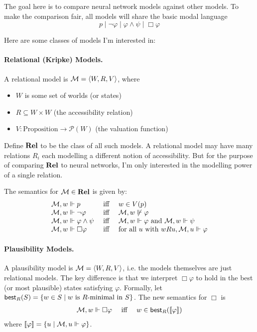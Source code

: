 \documentclass[letterpaper]{article}
\begin{document}
The goal here is to compare neural network models against other models.  To make the comparison fair, all models will share the basic modal language
\[
    p \mid \neg \varphi \mid \varphi \land \psi \mid \Box \varphi
\]

Here are some classes of models I'm interested in:

\paragraph*{Relational (Kripke) Models.} A relational model is $\mathcal{M} = \langle W, R, V \rangle$, where 
\begin{itemize}
    \item $W$ is some set of worlds (or states)
    \item $R \subseteq W \times W$ (the accessibility relation)
    \item $V : \textrm{Proposition} \to \mathcal{P}(W)$ (the valuation function)
\end{itemize}
Define $\textrm{\textbf{Rel}}$ to be the class of all such models.  A relational model may have many relations $R_i$ each modelling a different notion of accessibility.  But for the purpose of comparing $\textrm{\textbf{Rel}}$ to neural networks, I'm only interested in the modelling power of a single relation.

The semantics for $\mathcal{M} \in \textrm{\textbf{Rel}}$ is given by:
\[
\begin{array}{lcl}
    \mathcal{M}, w \Vdash p & \mbox{ iff } & w \in V(p)\\
    \mathcal{M}, w \Vdash \neg \varphi & \mbox{ iff } & \mathcal{M}, w \not \Vdash \varphi\\
    \mathcal{M}, w \Vdash \varphi \land \psi & \mbox{ iff } & \mathcal{M}, w \Vdash \varphi \mbox{ and } \mathcal{M}, w \Vdash \psi\\
    \mathcal{M}, w \Vdash \Box \varphi & \mbox{ iff } & \mbox{for all } u \mbox{ with } w{R}u, \mathcal{M}, u \Vdash \varphi
\end{array}
\]

\paragraph*{Plausibility Models.}
A plausibility model is $\mathcal{M} = \langle W, R, V \rangle$, i.e. the models themselves are just relational models.  The key difference is that we interpret $\Box \varphi$ to hold in the best (or most plausible) states satisfying $\varphi$.  Formally, let $\mathsf{best}_R{(S)} = \{ w \in S \mid w \textrm{ is } R\textrm{-minimal in } S \}$.  The new semantics for $\Box$ is
\[
\begin{array}{lcl}
    \mathcal{M}, w \Vdash \Box \varphi & \mbox{ iff } & w \in \mathsf{best}_R{([\![\mbox{\em $ \varphi $\/}]\!])}
\end{array}
\]
where $[\![\mbox{\em $ \varphi $\/}]\!] = \{ u \mid \mathcal{M}, u \Vdash \varphi \}$.
\end{document}
